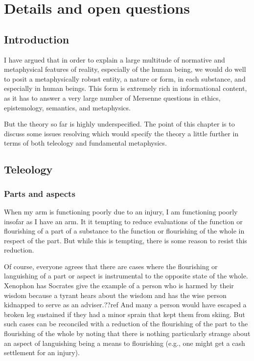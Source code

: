 \def\mychapter{X}


\chapter{Details and open questions}\label{ch:details}
\section{Introduction}
I have argued that in order to explain a large multitude of normative and metaphysical features 
of reality, especially of the human being, we would do well to posit a metaphysically robust 
entity, a nature or form, in each substance, and especially in human beings. This form is extremely rich 
in informational content, 
as it has to answer a very large number of Mersenne questions in ethics, epistemology, semantics,
and metaphysics.

But the theory so far is highly underspecified. The point of this chapter is to discuss some issues
resolving which would specify the theory a little further in terms of both teleology and fundamental metaphysics. 

\section{Teleology}
\subsection{Parts and aspects}
When my arm is functioning poorly due to an injury, I am functioning poorly insofar
as I have an arm. It it tempting to reduce evaluations of the function or flourishing
of a part of a substance to the function or flourishing of the whole in respect of the
part. But while this is tempting, there is some reason to resist this reduction.

Of course, everyone agrees that there are cases where the flourishing or languishing of a part or aspect is
instrumental to the opposite state of the whole. Xenophon has Socrates give the example of a 
person who is harmed by their wisdom because a tyrant hears about the wisdom and has the
wise person kidnapped to serve as an adviser.??ref And many a person would have escaped a broken
leg sustained if they had a minor sprain that kept them from skiing. But such cases can be
reconciled with a reduction of the flourishing of the part to the flourishing of the whole by
noting that there is nothing particularly strange about an aspect of languishing being a means to 
flourishing (e.g., one might get a cash settlement for an injury). 

